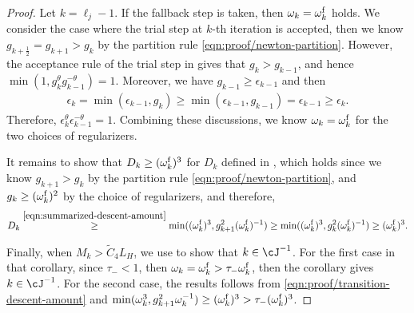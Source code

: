\begin{proof}
    Let $k = \ell_j - 1$.
    If the fallback step is taken, then $\omega_k = \omega_k^{\mathrm{f}}$ holds.
    We consider the case where the trial step at $k$-th iteration is accepted, 
    then we know $g_{k + \frac{1}{2}} = g_{k+1} 
    > g_k$ by the partition rule \eqref{eqn:proof/newton-partition}.
    However, the acceptance rule of the trial step in  
    gives that $g_k > g_{k-1}$, 
    and hence $\min(1, g_k^\theta g_{k-1}^{-\theta}) = 1$.
    Moreover, we have $g_{k-1} \geq \epsilon_{k-1}$ and then 
    \begin{align*}
    \epsilon_k 
    = \min(\epsilon_{k-1}, g_k) 
    \geq \min(\epsilon_{k-1}, g_{k-1}) 
    = \epsilon_{k-1} \geq \epsilon_k.
    \end{align*}
    Therefore, $\epsilon_k^\theta \epsilon_{k-1}^{-\theta} = 1$.
    Combining these discussions, we know $\omega_k = \omega_k^{\mathrm{f}}$ for the two choices of regularizers.

    It remains to show that $D_k \geq(\omega_k^{\mathrm{f}})^3$ for $D_k$ defined in ,
    which holds since we know
    $g_{k+1} > g_k$
    by the partition rule \eqref{eqn:proof/newton-partition}, and $g_k \geq (\omega_k^{\mathrm{f}})^2$ by the choice of regularizers, and therefore,
    \begin{align}
    D_k \overset{\eqref{eqn:summarized-descent-amount}}{\geq}
    \min((\omega_k^{\mathrm{f}})^3, g_{k+1}^2(\omega_k^{\mathrm{f}})^{-1}) 
    \geq \min((\omega_k^{\mathrm{f}})^3, g_{k}^2(\omega_k^{\mathrm{f}})^{-1}) 
    \geq (\omega_k^{\mathrm{f}})^3.
    \label{eqn:proof/transition-descent-amount}
    \end{align}


Finally, when $M_k > \tilde C_4 L_H$, we use  to show that $k \in \cJ^{-1}$.
For the first case in that corollary,
since $\tau_- < 1$, then  $\omega_{k} = \omega_{k}^{\mathrm{f}} > \tau_- \omega_{k}^{\mathrm{f}}$, 
then the corollary gives $k \in \cJ^{-1}$.
For the second case, the results follows from \eqref{eqn:proof/transition-descent-amount} and 
$\min(\omega_k^3, g_{k+1}^2\omega_k^{-1}) \geq (\omega_k^{\mathrm{f}})^3 > \tau_- (\omega_k^{\mathrm{f}})^3$.
\end{proof}

